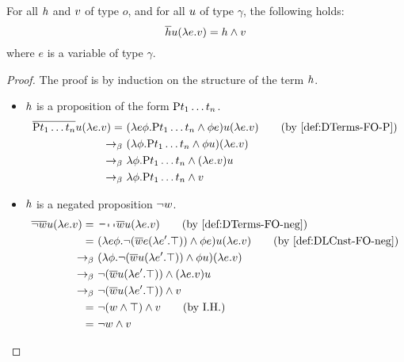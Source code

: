 \begin{proposition} For all $\h1$ and $\v1$ of type $o$, and for all $\u1$ of type $\gamma$, the following holds: $$\tr{\h1} \u1 (\lambda e.\v1) =  \h1 \land \v1$$ where $e$ is a variable of type $\gamma$. \label{DL-FO-handv}
\end{proposition}
\begin{proof}
The proof is by induction on the structure of the term $\h1$.
\begin{itemize}
\item $\h1$ is a proposition of the form $\P1 t_1 \dots t_n$.
\begin{align}
\tr{\P1 \t1_1 \dots \t1_n} \u1  (\lambda e.\v1)  = \ & (\lambda e \phi. \P1 \t1_1 \dots \t1_n \land \phi e) \u1  (\lambda e.\v1) \tag{by~\eqref{def:DTerms-FO-P}} \\
\bconv \ & (\lambda  \phi. \P1 \t1_1 \dots \t1_n \land \phi \u1)   (\lambda e.\v1) \notag \\
\bconv \ & \lambda  \phi. \P1 \t1_1 \dots \t1_n \land (\lambda e.\v1) \u1    \notag \\
\bconv \ & \lambda  \phi. \P1 \t1_1 \dots \t1_n \land \v1    \notag 
\end{align}

\item  $\h1$ is a negated proposition $ \neg \w1$. 
\begin{align}
\tr{\neg \w1} \u1 (\lambda e. \v1) = \ &  \n2 \tr{\w1}  \u1 (\lambda e. \v1)  \tag{by~\eqref{def:DTerms-FO-neg}} \\
= \ & ( \lambda e \phi. \neg (\tr{\w1} e (\lambda e'. \top) ) \land \phi e)  \u1 (\lambda e. \v1)  \tag{by~\eqref{def:DLCnst-FO-neg}} \\
\bconv \ & ( \lambda \phi.\neg (\tr{\w1} \u1 (\lambda e'. \top) ) \land \phi \u1 ) (\lambda e. \v1)  \notag \\
\bconv \ & \neg (\tr{\w1} \u1 (\lambda e'. \top) ) \land  (\lambda e. \v1) \u1   \notag \\
\bconv \ & \neg (\tr{\w1} \u1 (\lambda e'. \top) ) \land   \v1   \notag \\
= \ & \neg(\w1 \land \top) \land \v1 \tag{by I.H.} \\
= \ & \neg \w1 \land \v1
\end{align}


\end{itemize}
\end{proof}
